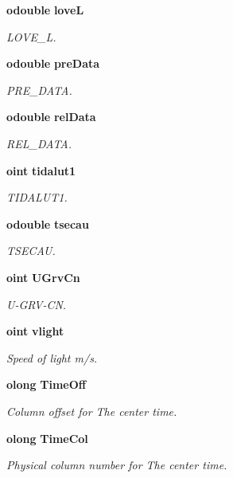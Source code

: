 \begin{CompactItemize}
{\bf odouble} {\bf love\-L}
\begin{CompactList}\small\item\em LOVE\_\-L. \item\end{CompactList}\item 
{\bf odouble} {\bf pre\-Data}
\begin{CompactList}\small\item\em PRE\_\-DATA. \item\end{CompactList}\item 
{\bf odouble} {\bf rel\-Data}
\begin{CompactList}\small\item\em REL\_\-DATA. \item\end{CompactList}\item 
{\bf oint} {\bf tidalut1}
\begin{CompactList}\small\item\em TIDALUT1. \item\end{CompactList}\item 
{\bf odouble} {\bf tsecau}
\begin{CompactList}\small\item\em TSECAU. \item\end{CompactList}\item 
{\bf oint} {\bf UGrv\-Cn}
\begin{CompactList}\small\item\em U-GRV-CN. \item\end{CompactList}\item 
{\bf oint} {\bf vlight}
\begin{CompactList}\small\item\em Speed of light m/s. \item\end{CompactList}\item 
{\bf olong} {\bf Time\-Off}
\begin{CompactList}\small\item\em Column offset for The center time. \item\end{CompactList}\item 
{\bf olong} {\bf Time\-Col}
\begin{CompactList}\small\item\em Physical column number for The center time. \item\end{CompactList}\item 

\end{CompactItemize}
